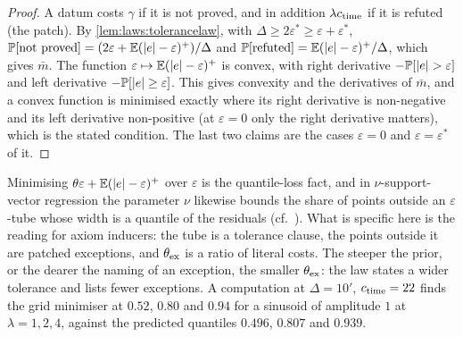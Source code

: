 \begin{proof}
A datum costs $\gamma$ if it is not proved, and in addition $\lambda c_{\rm time}$ if it is refuted (the patch). By \cref{lem:laws:tolerancelaw}, with $\Delta\ge2\varepsilon^*\ge\varepsilon+\varepsilon^*$, $\mathbb{P}[\text{not proved}]=(2\varepsilon+\mathbb{E}(\lvert e\rvert-\varepsilon)^+)/\Delta$ and $\mathbb{P}[\text{refuted}]=\mathbb{E}(\lvert e\rvert-\varepsilon)^+/\Delta$, which gives $\bar m$. The function $\varepsilon\mapsto\mathbb{E}(\lvert e\rvert-\varepsilon)^+$ is convex, with right derivative $-\mathbb{P}[\lvert e\rvert>\varepsilon]$ and left derivative $-\mathbb{P}[\lvert e\rvert\ge\varepsilon]$. This gives convexity and the derivatives of $\bar m$, and a convex function is minimised exactly where its right derivative is non-negative and its left derivative non-positive (at $\varepsilon=0$ only the right derivative matters), which is the stated condition. The last two claims are the cases $\varepsilon=0$ and $\varepsilon=\varepsilon^*$ of it.
\end{proof}

Minimising $\theta\varepsilon+\mathbb{E}(\lvert e\rvert-\varepsilon)^+$ over $\varepsilon$ is the quantile-loss fact, and in $\nu$-support-vector regression the parameter $\nu$ likewise bounds the share of points outside an $\varepsilon$-tube whose width is a quantile of the residuals (cf.\ \citealp{scholkopf2000new}). What is specific here is the reading for axiom inducers: the tube is a tolerance clause, the points outside it are patched exceptions, and $\theta_{\rm ex}$ is a ratio of literal costs. The steeper the prior, or the dearer the naming of an exception, the smaller $\theta_{\rm ex}$: the law states a wider tolerance and lists fewer exceptions. A computation at $\Delta=10'$, $c_{\rm time}=22$ finds the grid minimiser at $0.52$, $0.80$ and $0.94$ for a sinusoid of amplitude $1$ at $\lambda=1,2,4$, against the predicted quantiles $0.496$, $0.807$ and $0.939$.

